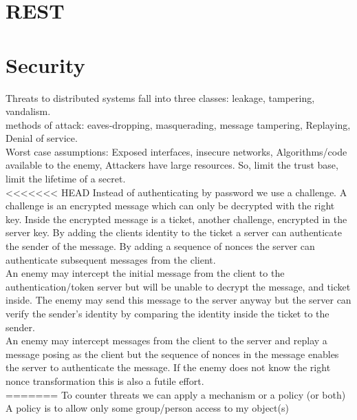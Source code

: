   



\section{REST}
\section{Security}
Threats to distributed systems fall into three classes: leakage, tampering, vandalism.\\
 
methods of attack: eaves-dropping, masquerading, message tampering, Replaying, Denial of service.\\

Worst case assumptions: Exposed interfaces, insecure networks, Algorithms/code available to the enemy, Attackers have large resources. So, limit the trust base, limit the lifetime of a secret.\\

<<<<<<< HEAD
Instead of authenticating by password we use a challenge. A challenge is an encrypted message which can only be decrypted with the right key. Inside the encrypted message is a ticket, another challenge, encrypted in the server key. By adding the clients identity to the ticket a server can authenticate the sender of the message. By adding a sequence of nonces the server can authenticate subsequent messages from the client.\\

An enemy may intercept the initial message from the client to the authentication/token server but will be unable to decrypt the message, and ticket inside. The enemy may send this message to the server anyway but the server can verify the sender's identity by comparing the identity inside the ticket to the sender. \\

An enemy may intercept messages from the client to the server and replay a message posing as the client but the sequence of nonces in the message enables the server to authenticate the message. If the enemy does not know the right nonce transformation this is also a futile effort.\\
=======
To counter threats we can apply a mechanism or a policy (or both)\\
	
A policy is to allow only some group/person access to my object(s)\\


